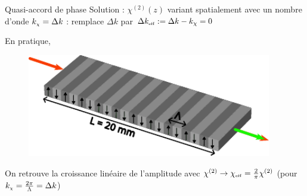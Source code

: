 \documentclass{beamer}
\newcommand{\chie}{\chi_\mathsc{eff}}
\newcommand{\dke}{\Delta k_\mathsc{eff}}
\begin{document}
\begin{frame}{Quasi-accord de phase}
Solution : $\chi^{(2)}(z)$ variant spatialement avec un nombre d'onde $k_{\mathrm{\scriptscriptstyle {\chi}}} = \Delta k$ : remplace $\Delta k$ par $\dke := \Delta k - k_\chi = 0$
\pause

En pratique, %

\begin{figure}
\centering
\includegraphics[height=4.5cm]{./img/PP.pdf}
\end{figure}


\end{frame}


\begin{frame}
\centering


\begin{beamerboxesrounded}[width=0.8\textwidth]{}
On retrouve la croissance linéaire de l'amplitude avec $\chi^{(2)} \rightarrow \chie = \frac2\pi \chi^{(2)}$ (pour $k_{\mathrm{\scriptscriptstyle {\chi}}} = \frac{2\pi}{\Lambda} = \Delta k$)
\end{beamerboxesrounded}
\end{frame}

\end{document}
